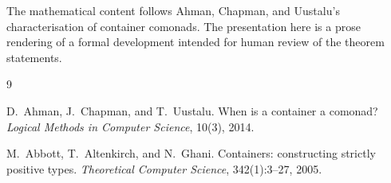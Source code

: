 \documentclass[11pt,a4paper]{article}
\theoremstyle{plain}
\theoremstyle{definition}
\begin{document}
The mathematical content follows Ahman, Chapman, and Uustalu's characterisation
of container comonads. The presentation here is a prose rendering of a formal
development intended for human review of the theorem statements.

\begin{thebibliography}{9}

D.~Ahman, J.~Chapman, and T.~Uustalu.
\newblock When is a container a comonad?
\newblock \emph{Logical Methods in Computer Science}, 10(3), 2014.

M.~Abbott, T.~Altenkirch, and N.~Ghani.
\newblock Containers: constructing strictly positive types.
\newblock \emph{Theoretical Computer Science}, 342(1):3--27, 2005.

\end{thebibliography}
\end{document}
